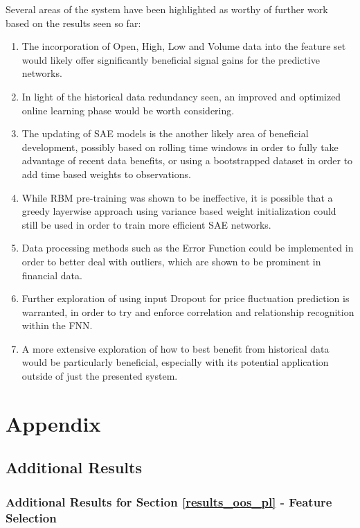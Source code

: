 \documentclass[a4paper,11pt,oneside]{article}
\theoremstyle{plain}
\theoremstyle{definition}
\begin{document}
	Several areas of the system have been highlighted as worthy of further work based on the results seen so far: 
	\begin{enumerate}
		\item The incorporation of Open, High, Low and Volume data into the feature set would likely offer significantly beneficial signal gains for the predictive networks.
		\item In light of the historical data redundancy seen, an improved and optimized online learning phase would be worth considering.
		\item The updating of SAE models is the another likely area of beneficial development, possibly based on rolling time windows in order to fully take advantage of recent data benefits, or using a bootstrapped dataset in order to add time based weights to observations.
		\item While RBM pre-training was shown to be ineffective, it is possible that a greedy layerwise approach using variance based weight initialization could still be used in order to train more efficient SAE networks.
		\item Data processing methods such as the Error Function could be implemented in order to better deal with outliers, which are shown to be prominent in financial data.
		\item Further exploration of using input Dropout for price fluctuation prediction is warranted, in order to try and enforce correlation and relationship recognition within the FNN.
		\item A more extensive exploration of how to best benefit from historical data would be particularly beneficial, especially with its potential application outside of just the presented system.
	\end{enumerate}
	
	\newpage
	\section{Appendix}\label{Appendix}
	
	\subsection{Additional Results}
	
	\subsubsection{Additional Results for Section \ref{results_oos_pl} - Feature Selection }\label{results_features_appendix}
	
\end{document}
